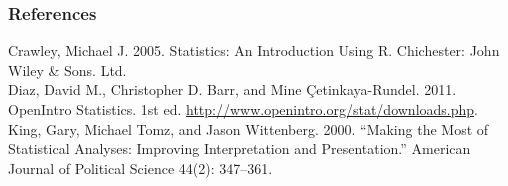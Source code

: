 \documentclass{beamer}\usepackage{graphicx, color}
\begin{document}

\begin{frame}[allowframebreaks]
  \frametitle{References}
  Crawley, Michael J. 2005. Statistics: An Introduction Using R. Chichester: John Wiley & Sons. Ltd. \\[0.25cm]
  Diaz, David M., Christopher D. Barr, and Mine \c{C}etinkaya-Rundel. 2011. OpenIntro 
  Statistics. 1st ed. \url{http://www.openintro.org/stat/downloads.php}. \\[0.25cm] 
  King, Gary, Michael Tomz, and Jason Wittenberg. 2000. “Making the Most of Statistical Analyses: Improving Interpretation and Presentation.” American Journal of Political Science 44(2): 347–361.
\end{frame}
\end{document}

